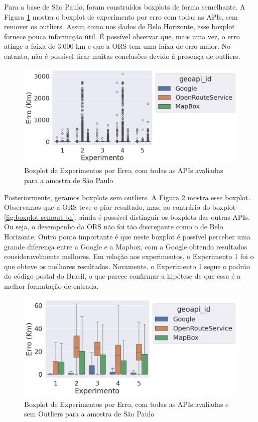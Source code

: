 Para a base de São Paulo, foram construídos boxplots de forma semelhante. A Figura \ref{fig:boxplot-completo-sp} mostra o boxplot de experimento por erro com todas as APIs, sem remover os outliers. Assim como nos dados de Belo Horizonte, esse boxplot fornece pouca informação útil. É possível observar que, mais uma vez, o erro atinge a faixa de 3.000 km e que a ORS tem uma faixa de erro maior. No entanto, não é possível tirar muitas conclusões devido à presença de outliers.

\begin{figure}[h]
    \centering
    \includegraphics[width=\textwidth]{Figuras/boxplotExperimentoSP.png}
    \caption{Boxplot de Experimentos por Erro, com todas as APIs avaliadas para a amostra de São Paulo}
    \label{fig:boxplot-completo-sp}
\end{figure}

Posteriormente, geramos boxplots sem outliers. A Figura \ref{fig:boxplot-semout-sp} mostra esse boxplot. Observamos que a ORS teve o pior resultado, mas, ao contrário do boxplot \ref{fig:boxplot-semout-bh}, ainda é possível distinguir os boxplots das outras APIs. Ou seja, o desempenho da ORS não foi tão discrepante como o de Belo Horizonte. Outro ponto importante é que neste boxplot é possível perceber uma grande diferença entre a Google e a Mapbox, com a Google obtendo resultados consideravelmente melhores. Em relação aos experimentos, o Experimento 1 foi o que obteve os melhores resultados. Novamente, o Experimento 1 segue o padrão do código postal do Brasil, o que parece confirmar a hipótese de que essa é a melhor formatação de entrada.


\begin{figure}[h]
    \centering
    \includegraphics[width=\textwidth]{Figuras/boxplotExperimentoSemOutSP.png}
    \caption{Boxplot de Experimentos por Erro, com todas as APIs avaliadas e sem Outliers para a amostra de São Paulo}
    \label{fig:boxplot-semout-sp}
\end{figure}

